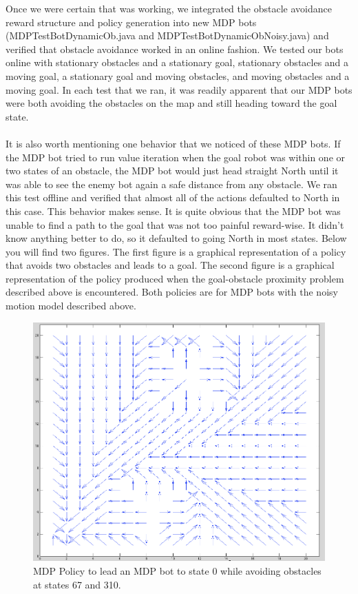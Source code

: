 \documentclass{aiaa-tc}%
\begin{document}
 Once we were certain that was working, we integrated the obstacle avoidance reward structure and policy generation into new MDP bots (MDPTestBotDynamicOb.java and MDPTestBotDynamicObNoisy.java) and verified that obstacle avoidance worked in an online fashion. We tested our bots online with stationary obstacles and a stationary goal, stationary obstacles and a moving goal, a stationary goal and moving obstacles, and moving obstacles and a moving goal. In each test that we ran, it was readily apparent that our MDP bots were both avoiding the obstacles on the map and still heading toward the goal state. \\ \\
It is also worth mentioning one behavior that we noticed of these MDP bots. If the MDP bot tried to run value iteration when the goal robot was within one or two states of an obstacle, the MDP bot would just head straight North until it was able to see the enemy bot again a safe distance from any obstacle. We ran this test offline and verified that almost all of the actions defaulted to North in this case. This behavior makes sense. It is quite obvious that the MDP bot was unable to find a path to the goal that was not too painful reward-wise. It didn't know anything better to do, so it defaulted to going North in most states. Below you will find two figures. The first figure is a graphical representation of a policy that avoids two obstacles and leads to a goal. The second figure is a graphical representation of the policy produced when the goal-obstacle proximity problem described above is encountered. Both policies are for MDP bots with the noisy motion model described above.
 \begin{figure}[htbp]
   \centering
   \includegraphics[width=170mm]{mpd_noisy_obstacles.png} 
   \caption{MDP Policy to lead an MDP bot to state 0 while avoiding obstacles at states 67 and 310.}
   \label{fig:sample}
\end{figure}
\end{document}
